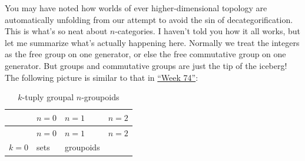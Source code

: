 \documentclass{article}
\begin{document}
You may have noted how worlds of ever higher-dimensional topology are
automatically unfolding from our attempt to avoid the sin of
decategorification. This is what's so neat about \(n\)-categories. I
haven't told you how it all works, but let me summarize what's actually
happening here. Normally we treat the integers as the free group on one
generator, or else the free commutative group on one generator. But
groups and commutative groups are just the tip of the iceberg! The
following picture is similar to that in
\protect\hyperlink{week74}{``Week 74''}:

\begin{longtable}[]{@{}llll@{}}
\caption{\(k\)-tuply groupal \(n\)-groupoids}\tabularnewline
\toprule
\begin{minipage}[b]{0.26\columnwidth}\raggedright
\strut
\end{minipage} & \begin{minipage}[b]{0.21\columnwidth}\raggedright
\(n=0\)\strut
\end{minipage} & \begin{minipage}[b]{0.21\columnwidth}\raggedright
\(n=1\)\strut
\end{minipage} & \begin{minipage}[b]{0.21\columnwidth}\raggedright
\(n=2\)\strut
\end{minipage}\tabularnewline
\midrule
\endfirsthead
\toprule
\begin{minipage}[b]{0.26\columnwidth}\raggedright
\strut
\end{minipage} & \begin{minipage}[b]{0.21\columnwidth}\raggedright
\(n=0\)\strut
\end{minipage} & \begin{minipage}[b]{0.21\columnwidth}\raggedright
\(n=1\)\strut
\end{minipage} & \begin{minipage}[b]{0.21\columnwidth}\raggedright
\(n=2\)\strut
\end{minipage}\tabularnewline
\midrule
\endhead
\begin{minipage}[t]{0.26\columnwidth}\raggedright
\(k=0\)\strut
\end{minipage} & \begin{minipage}[t]{0.21\columnwidth}\raggedright
sets\strut
\end{minipage} & \begin{minipage}[t]{0.21\columnwidth}\raggedright
groupoids\strut
\end{minipage} & \begin{minipage}[t]{0.21\columnwidth}\raggedright

\end{minipage}
\end{longtable}
\end{document}
